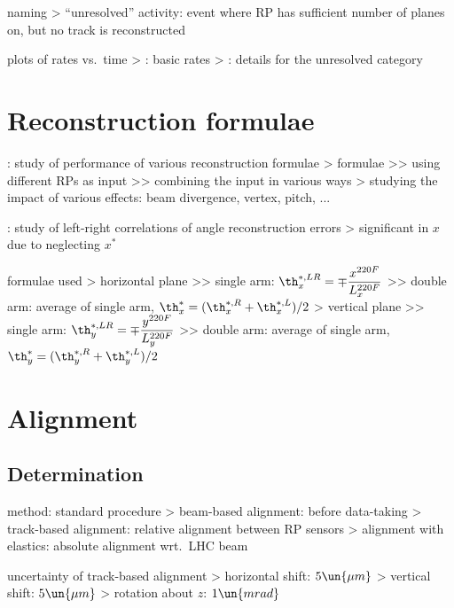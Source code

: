 \> naming
\>> ``unresolved'' activity: event where RP has sufficient number of planes on, but no track is reconstructed

\> plots of rates vs.~time
\>> : basic rates
\>> : details for the unresolved category

\chapter{Reconstruction formulae}

\>  : study of performance of various reconstruction formulae
\>> formulae
\>>> using different RPs as input
\>>> combining the input in various ways
\>> studying the impact of various effects: beam divergence, vertex, pitch, ...

\>  : study of left-right correlations of angle reconstruction errors
\>> significant in $x$ due to neglecting $x^*$

\> formulae used
\>> horizontal plane
\>>> single arm: $\displaystyle \th_x^{*,LR} = \mp {x^{220F}\over L_x^{220F}}$
\>>> double arm: average of single arm, $\th_x^* = (\th_x^{*,R} + \th_x^{*,L}) / 2$
\>> vertical plane
\>>> single arm: $\displaystyle \th_y^{*,LR} = \mp {y^{220F}\over L_y^{220F}}$
\>>> double arm: average of single arm, $\th_y^* = (\th_y^{*,R} + \th_y^{*,L}) / 2$


\chapter[alignment]{Alignment}

\section[alignment-det]{Determination}

\> method: standard procedure
\>> beam-based alignment: before data-taking
\>> track-based alignment: relative alignment between RP sensors
\>> alignment with elastics: absolute alignment wrt.~LHC beam

\> uncertainty of track-based alignment
\>> horizontal shift: $5\un{\mu m}$
\>> vertical shift: $5\un{\mu m}$
\>> rotation about $z$: $1\un{mrad}$

